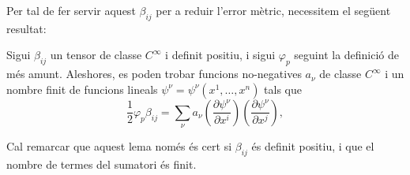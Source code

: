 Per tal de fer servir aquest $\beta_{ij}$ per a reduir l'error mètric, necessitem el següent resultat:
\begin{lema}
    Sigui $\beta_{ij}$ un tensor de classe $C^\infty$ i definit positiu, i sigui $\varphi_p$ seguint la definició de més amunt. Aleshores, es poden trobar funcions no-negatives $a_\nu$ de classe $C^\infty$ i un nombre finit de funcions lineals $\psi^\nu = \psi^\nu(x^1, \dots, x^n)$ tals que
\begin{equation}\label{eq:lema_descomp}
    \frac12\varphi_p\beta_{ij} = \sum_\nu a_\nu \left(\frac{\partial\psi^\nu}{\partial x^i}\right)\left(\frac{\partial\psi^\nu}{\partial x^j}\right),
\end{equation}
\end{lema}
\begin{obs}
    Cal remarcar que aquest lema només és cert si $\beta_{ij}$ és definit positiu, i que el nombre de termes del sumatori és finit.
\end{obs}
